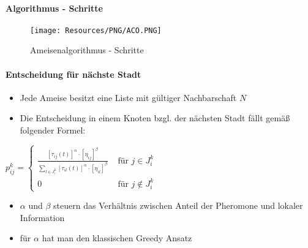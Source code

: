 \paragraph{Algorithmus - Schritte}
\begin{figure}[H]
	\begin{center}
		\texttt{[image: Resources/PNG/ACO.PNG]}
		\caption{Ameisenalgorithmus - Schritte}
		\label{fig:PNG/ACO.PNG}
	\end{center}
\end{figure}
\paragraph{Entscheidung für nächste Stadt}
\begin{itemize}
	\item Jede Ameise besitzt eine Liste mit gültiger Nachbarschaft $N$
	\item Die Entscheidung in einem Knoten bzgl. der nächsten Stadt fällt gemäß folgender Formel:
\end{itemize}
$p_{i j}^{k}=\left\{\begin{array}{ll}{\frac{\left[\tau_{i j}(t)\right]^{\alpha} \cdot\left[\eta_{i j}\right]^{\beta}}{\sum_{l \in J_{i}^{k}}\left[\tau_{i l}(t)\right]^{\alpha} \cdot\left[\eta_{i l}\right]^{\beta}}} & {\text { für } j \in J_{i}^{k}} \\ {0} & {\text { für } j \notin J_{i}^{k}}\end{array}\right.$
\begin{itemize}
	\item $\alpha$ und $\beta$ steuern das Verhältnis zwischen Anteil der Pheromone und lokaler Information
	\item für $\alpha$ hat man den klassischen Greedy Ansatz
\end{itemize}
